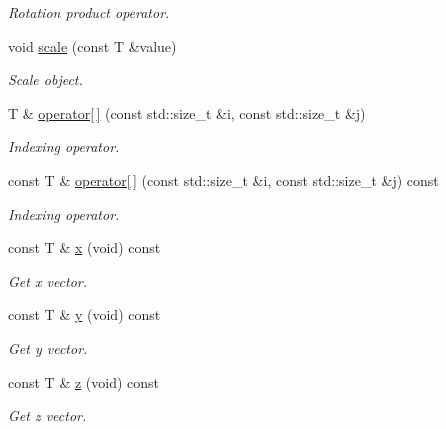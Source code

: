 \begin{DoxyCompactItemize}
\begin{DoxyCompactList}\small\item\em Rotation product operator. \end{DoxyCompactList}\item 
void \hyperlink{classddd_1_1rotation_ab4911ee3dd5709e25f6dc7db6bad2c21}{scale} (const T \&value)
\begin{DoxyCompactList}\small\item\em Scale object. \end{DoxyCompactList}\item 
T \& \hyperlink{classddd_1_1rotation_a25411622296849f461c6f15aeaf280a0}{operator\mbox{[}$\,$\mbox{]}} (const std\+::size\+\_\+t \&i, const std\+::size\+\_\+t \&j)
\begin{DoxyCompactList}\small\item\em Indexing operator. \end{DoxyCompactList}\item 
const T \& \hyperlink{classddd_1_1rotation_abe1b800d2857b75ad2d00de4743bfa85}{operator\mbox{[}$\,$\mbox{]}} (const std\+::size\+\_\+t \&i, const std\+::size\+\_\+t \&j) const
\begin{DoxyCompactList}\small\item\em Indexing operator. \end{DoxyCompactList}\item 
\mbox{\label{classddd_1_1rotation_a6888d588f65756080db76224a262140b}} 
const T \& \hyperlink{classddd_1_1rotation_a6888d588f65756080db76224a262140b}{x} (void) const
\begin{DoxyCompactList}\small\item\em Get x vector. \end{DoxyCompactList}\item 
\mbox{\label{classddd_1_1rotation_a9abadbab25e48775a4dd73c43f9d03ac}} 
const T \& \hyperlink{classddd_1_1rotation_a9abadbab25e48775a4dd73c43f9d03ac}{y} (void) const
\begin{DoxyCompactList}\small\item\em Get y vector. \end{DoxyCompactList}\item 
\mbox{\label{classddd_1_1rotation_a6128afc3f093ba083b2f79b111990ae7}} 
const T \& \hyperlink{classddd_1_1rotation_a6128afc3f093ba083b2f79b111990ae7}{z} (void) const
\begin{DoxyCompactList}\small\item\em Get z vector. \end{DoxyCompactList}\item 

\end{DoxyCompactItemize}
